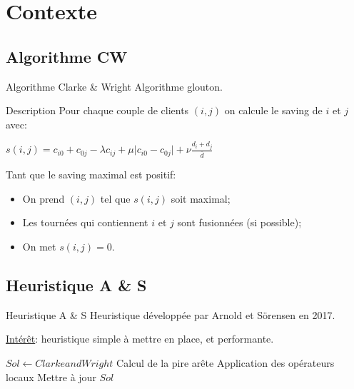 \documentclass{beamer}
\begin{document}
\section{Contexte}

\subsection{Algorithme CW}

\begin{frame}{Algorithme Clarke \& Wright}
Algorithme glouton. 

\begin{block}{Description}
Pour chaque couple de clients $(i,j)$ on calcule le saving de $i$ et $j$ avec:
\begin{center}
$s(i,j) = c_{i0} + c_{0j} - \lambda c_{ij} + \mu \vert c_{i0} - c_{0j} \vert + \nu \frac{d_i + d_j}{\overline{d}}$
\end{center}
Tant que le saving maximal est positif:
\begin{itemize}
\item On prend $(i,j)$ tel que $s(i,j)$ soit maximal;
\item Les tournées qui contiennent $i$ et $j$ sont fusionnées (si possible);
\item On met $s(i,j) = 0$.
\end{itemize} 

\end{block}
\end{frame}

\subsection{Heuristique A \& S}

\begin{frame}{Heuristique A \& S}
Heuristique développée par Arnold et Sörensen en 2017. 

\underline{Intérêt}: heuristique simple à mettre en place, et performante.

\begin{algorithm}[H]
\DontPrintSemicolon %
$Sol \gets Clarke and Wright$\;
 {
	Calcul de la pire arête\;
	Application des opérateurs locaux\;
	 {
		Mettre à jour $Sol$\;
	}
}
\;
\caption{{\sc AS} applique l'heuristique A\& S au problème considéré}
\label{algo:AS}
\end{algorithm}

\end{frame}
\end{document}
